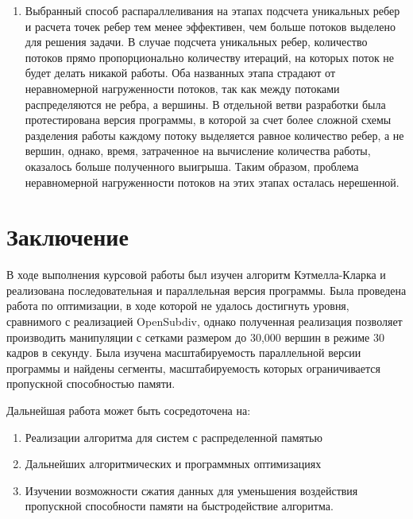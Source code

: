 \documentclass[14pt]{extarticle}
\begin{document}
\begin{enumerate}
    \item Выбранный способ распараллеливания на этапах подсчета уникальных ребер и расчета точек ребер тем менее эффективен, чем больше потоков выделено для решения задачи. В случае подсчета уникальных ребер, количество потоков прямо пропорционально количеству итераций, на которых поток не будет делать никакой работы. Оба названных этапа страдают от неравномерной нагруженности потоков, так как между потоками распределяются не ребра, а вершины. В отдельной ветви разработки
        была протестирована версия программы, в которой за счет более сложной схемы разделения работы каждому потоку выделяется равное количество ребер, а не вершин, однако, время, затраченное на вычисление количества работы, оказалось больше полученного выигрыша. Таким образом, проблема неравномерной нагруженности потоков на этих этапах осталась нерешенной.
\end{enumerate}

\newpage
\section{Заключение}
В ходе выполнения курсовой работы был изучен алгоритм Кэтмелла-Кларка и реализована последовательная и параллельная версия программы. Была проведена работа по оптимизации, в ходе которой не удалось достигнуть уровня, сравнимого с реализацией OpenSubdiv, однако полученная реализация позволяет производить манипуляции с сетками размером до 30,000 вершин в режиме 30 кадров в секунду. Была изучена масштабируемость параллельной версии программы и найдены сегменты, масштабируемость которых
ограничивается пропускной способностью памяти.

Дальнейшая работа может быть сосредоточена на:
\begin{enumerate}
\item Реализации алгоритма для систем с распределенной памятью
\item Дальнейших алгоритмических и программных оптимизациях
\item Изучении возможности сжатия данных для уменьшения воздействия пропускной способности памяти на быстродействие алгоритма.
\end{enumerate}
\end{document}
